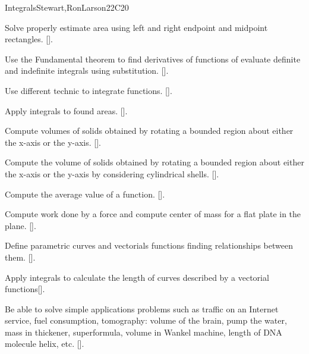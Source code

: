\begin{syllabus}
\begin{unit}{Integrals}{}{Stewart,RonLarson}{22}{C20}
   \begin{learningoutcomes}
      \item Solve properly estimate area using left and right endpoint and midpoint rectangles. [\Assessment].
      \item Use the Fundamental theorem to find derivatives of functions of evaluate definite and indefinite integrals using substitution. [\Assessment].
      \item Use different technic to integrate functions. [\Assessment].
      \item Apply integrals to found areas. [\Assessment].
      \item Compute volumes of solids obtained by rotating a bounded region about either the x-axis or the y-axis. [\Assessment].
      \item Compute the volume of solids obtained by rotating a bounded region about either the x-axis or the y-axis by considering cylindrical shells. [\Assessment].
      \item Compute the average value of a function. [\Assessment].
      \item Compute work done by a force and compute center of mass for a flat plate in the plane. [\Assessment].
      \item Define parametric curves and vectorials functions finding relationships between them. [\Assessment].
      \item Apply integrals to calculate the length of curves described by a vectorial functions[\Assessment].
      \item Be able to solve simple applications problems such as traffic on an Internet service, fuel consumption, tomography: volume of the brain, pump the water, mass in thickener, superformula, volume in Wankel machine, length of DNA molecule helix, etc. [\Assessment].
    \end{learningoutcomes}
\end{unit}

\begin{coursebibliography}
\end{coursebibliography}

\end{syllabus}

%
